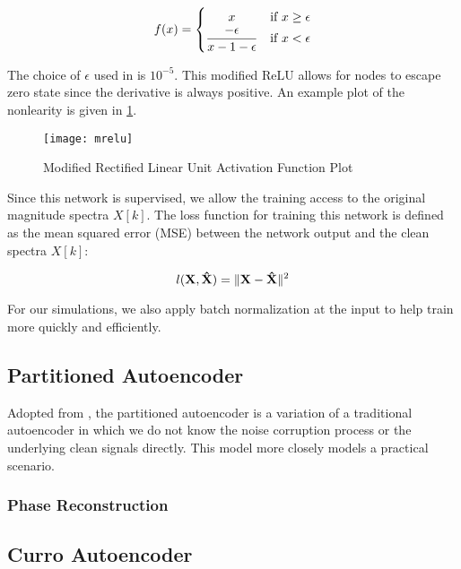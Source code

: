 \begin{equation}
f(x) =
    \begin{cases}
        \hfill x \hfill & \text{if $x \ge \epsilon$}\\
        \hfill \dfrac{-\epsilon}{x-1-\epsilon} & \text{if $x < \epsilon$}
    \end{cases}
\end{equation}

The choice of $\epsilon$ used in \cite{liu2014experiments} is $10^{-5}$. This modified ReLU allows for nodes to escape zero state since the derivative is always positive. An example plot of the nonlearity is given in \ref{fig:mrelu}.

\begin{figure}[!ht]
\centering
\texttt{[image: mrelu]}
\caption[Modified Rectified Linear Unit Activation]{Modified Rectified Linear Unit Activation Function Plot}
\label{fig:mrelu}
\end{figure}

Since this network is supervised, we allow the training access to the original magnitude spectra $X[k]$. The loss function for training this network is defined as the mean squared error (MSE) between the network output and the clean spectra $X[k]$:

\begin{equation}
l(\mathbf{X},\mathbf{\hat{X}}) = \lVert\mathbf{X}-\mathbf{\hat{X}}\rVert^{2}
\end{equation}

For our simulations, we also apply batch normalization at the input to help train more quickly and efficiently.

\subsection{Partitioned Autoencoder}

Adopted from \cite{stow}, the partitioned autoencoder is a variation of a traditional autoencoder in which we do not know the noise corruption process or the underlying clean signals directly. This model more closely models a practical scenario.

\subsubsection{Phase Reconstruction}

\subsection{Curro Autoencoder}


